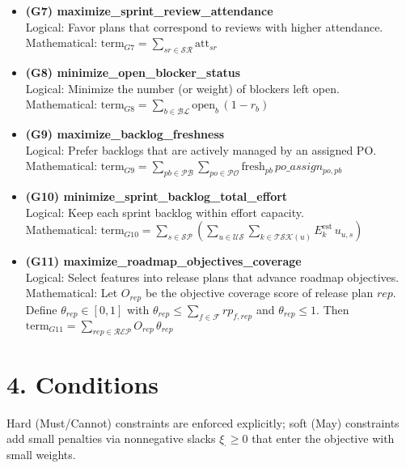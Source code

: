 \documentclass[11pt,a4paper]{article}
\begin{document}
\begin{itemize}[leftmargin=2.2em]
  \item \textbf{(G7) maximize\_sprint\_review\_attendance} \\
  Logical: Favor plans that correspond to reviews with higher attendance. \\
  Mathematical: $\displaystyle \text{term}_{G7}=\sum_{sr\in\mathcal{SR}} \text{att}_{sr}$

  \item \textbf{(G8) minimize\_open\_blocker\_status} \\
  Logical: Minimize the number (or weight) of blockers left open. \\
  Mathematical: $\displaystyle \text{term}_{G8}=\sum_{b\in\mathcal{BL}} \text{open}_{b}\,(1-r_b)$

  \item \textbf{(G9) maximize\_backlog\_freshness} \\
  Logical: Prefer backlogs that are actively managed by an assigned PO. \\
  Mathematical: $\displaystyle \text{term}_{G9}=\sum_{pb\in\mathcal{PB}} \sum_{po\in\mathcal{PO}} \text{fresh}_{pb}\, po\_assign_{po,pb}$

  \item \textbf{(G10) minimize\_sprint\_backlog\_total\_effort} \\
  Logical: Keep each sprint backlog within effort capacity. \\
  Mathematical: $\displaystyle \text{term}_{G10}=\sum_{s\in\mathcal{SP}}\left(\sum_{u\in\mathcal{US}} \sum_{k\in\mathcal{TSK}(u)} E^{\text{est}}_{k}\,u_{u,s}\right)$

  \item \textbf{(G11) maximize\_roadmap\_objectives\_coverage} \\
  Logical: Select features into release plans that advance roadmap objectives. \\
  Mathematical: Let $O_{rep}$ be the objective coverage score of release plan $rep$. Define $\theta_{rep}\in[0,1]$ with
  $\theta_{rep} \le \sum_{f\in\mathcal{F}} rp_{f,rep}$ and $\theta_{rep}\le 1$. Then 
  $\displaystyle \text{term}_{G11}=\sum_{rep\in\mathcal{REP}} O_{rep}\,\theta_{rep}$

\end{itemize}

\section{4. Conditions}
Hard (Must/Cannot) constraints are enforced explicitly; soft (May) constraints add small penalties via nonnegative slacks $\xi_{\cdot}\ge 0$ that enter the objective with small weights.
\end{document}
